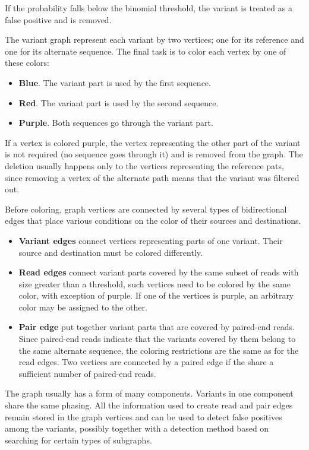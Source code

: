 If the probability falls below the binomial threshold, the variant is treated as a false positive and is removed.

The variant graph represent each variant by two vertices; one for its reference and one for its alternate sequence. The final task is to color each vertex by one of these colors:
\begin{itemize}
\item \textbf{Blue}. The variant part is used by the first sequence.
\item \textbf{Red}. The variant part is used by the second sequence.
\item \textbf{Purple}. Both sequences go through the variant part.
\end{itemize}

If a vertex is colored purple, the vertex representing the other part of the variant is not required (no sequence goes through it) and is removed from the graph. The deletion usually happens only to the vertices representing the reference pats, since removing a vertex of the alternate path means that the variant was filtered out.

Before coloring, graph vertices are connected by several types of bidirectional edges that place various conditions on the color of their sources and destinations.
\begin{itemize}
\item \textbf{Variant edges} connect vertices representing parts of one variant. Their source and destination must be colored differently.
\item \textbf{Read edges} connect variant parts covered by the same subset of reads with size greater than a threshold, such vertices need to be colored by the same color, with exception of purple. If one of the vertices is purple, an arbitrary color may be assigned
to the other.
\item \textbf{Pair edge} put together variant parts that are covered by paired-end reads. Since paired-end reads indicate that the variants covered by them belong to the same alternate sequence, the coloring restrictions are the same as for the read edges. Two vertices are connected by a paired edge if the share a sufficient number of paired-end reads.
\end{itemize}

The graph usually has a form of many components. Variants in one component share the same phasing. All the information used to create read and pair edges remain stored in the graph vertices and can be used to detect false positives among the variants, possibly together with a detection method based on searching for certain types of subgraphs.

